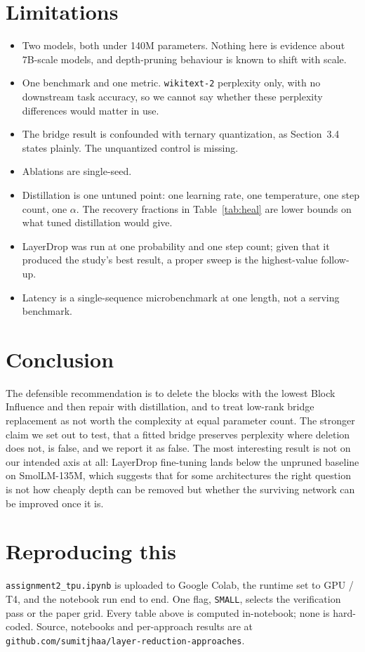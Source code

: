 \documentclass[11pt]{article}
\begin{document}
\section{Limitations}
\begin{itemize}
\item Two models, both under 140M parameters. Nothing here is evidence about
7B-scale models, and depth-pruning behaviour is known to shift with scale.
\item One benchmark and one metric. \texttt{wikitext-2} perplexity only, with
no downstream task accuracy, so we cannot say whether these perplexity
differences would matter in use.
\item The bridge result is confounded with ternary quantization, as
Section~3.4 states plainly. The unquantized control is missing.
\item Ablations are single-seed.
\item Distillation is one untuned point: one learning rate, one temperature,
one step count, one $\alpha$. The recovery fractions in
Table~\ref{tab:heal} are lower bounds on what tuned distillation would give.
\item LayerDrop was run at one probability and one step count; given that it
produced the study's best result, a proper sweep is the highest-value
follow-up.
\item Latency is a single-sequence microbenchmark at one length, not a
serving benchmark.
\end{itemize}

\section{Conclusion}
The defensible recommendation is to delete the blocks with the lowest Block
Influence and then repair with distillation, and to treat low-rank bridge
replacement as not worth the complexity at equal parameter count. The
stronger claim we set out to test, that a fitted bridge preserves perplexity
where deletion does not, is false, and we report it as false. The most
interesting result is not on our intended axis at all: LayerDrop fine-tuning
lands below the unpruned baseline on SmolLM-135M, which suggests that for
some architectures the right question is not how cheaply depth can be
removed but whether the surviving network can be improved once it is.

\section*{Reproducing this}
\texttt{assignment2\_tpu.ipynb} is uploaded to Google Colab, the runtime set
to GPU / T4, and the notebook run end to end. One flag, \texttt{SMALL},
selects the verification pass or the paper grid. Every table above is computed
in-notebook; none is hard-coded. Source, notebooks and per-approach results
are at \texttt{github.com/sumitjhaa/layer-reduction-approaches}.
\end{document}

